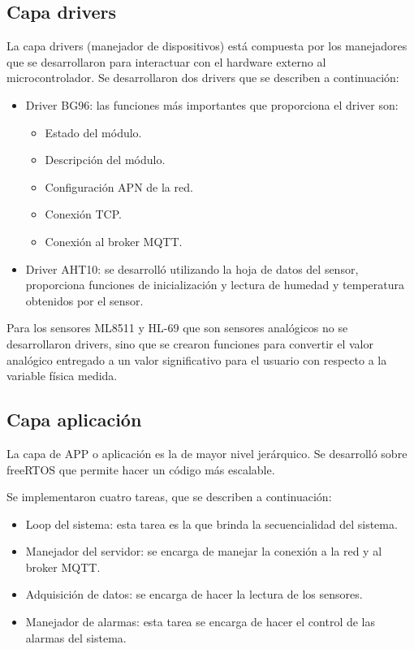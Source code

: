 \subsection{Capa drivers} 
La capa drivers (manejador de dispositivos) está compuesta por los manejadores que se desarrollaron para interactuar con el hardware externo al microcontrolador. Se desarrollaron dos drivers que se describen a continuación:
\begin{itemize}
  \item Driver BG96: las funciones más importantes que proporciona el driver son:
  \begin{itemize}
    \item Estado del módulo.
    \item Descripción del módulo.
    \item Configuración APN de la red.
    \item Conexión TCP.
    \item Conexión al broker MQTT.
  \end{itemize}
  \item Driver AHT10: se desarrolló utilizando la hoja de datos del sensor, proporciona funciones de inicialización y lectura de humedad y temperatura obtenidos por el sensor.
\end{itemize}
Para los sensores ML8511 y HL-69 que son sensores analógicos no se desarrollaron drivers, sino que se crearon funciones para convertir el valor analógico entregado a un valor significativo para el usuario con respecto a la variable física medida.
\subsection{Capa aplicación} 
La capa de APP o aplicación  es la de mayor nivel jerárquico. Se desarrolló sobre freeRTOS 
que permite hacer un código más escalable.

Se implementaron cuatro tareas, que se describen a continuación:
\begin{itemize}
    \item Loop del sistema: esta tarea es la que brinda la secuencialidad del sistema.
    \item Manejador del  servidor: se encarga de manejar la conexión a la red y al broker MQTT.
    \item Adquisición de datos: se encarga de hacer la lectura de los sensores.
    \item Manejador de alarmas: esta tarea se encarga de hacer el control de las alarmas del sistema.
\end{itemize}
\clearpage


